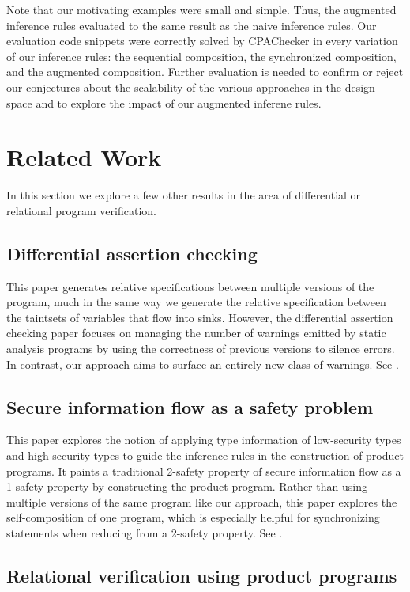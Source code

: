 \documentclass[letterpaper,twocolumn,10pt]{article}
\begin{document}
Note that our motivating examples were small and simple. Thus, the augmented inference rules evaluated to the same result as the naive inference rules. Our evaluation code snippets were correctly solved by CPAChecker in every variation of our inference rules: the sequential composition, the synchronized composition, and the augmented composition. Further evaluation is needed to confirm or reject our conjectures about the scalability of the various approaches in the design space and to explore the impact of our augmented inferene rules.

\section{Related Work}

In this section we explore a few other results in the area of differential or relational program verification.

\subsection{Differential assertion checking}

This paper generates relative specifications between multiple versions of the program, much in the same way we generate the relative specification between the taintsets of variables that flow into sinks. However, the differential assertion checking paper focuses on managing the number of warnings emitted by static analysis programs by using the correctness of previous versions to silence errors. In contrast, our approach aims to surface an entirely new class of warnings. See \cite{lahiri2013differential}.

\subsection{Secure information flow as a safety problem}
This paper explores the notion of applying type information of low-security types and high-security types to guide the inference rules in the construction of product programs. It paints a traditional 2-safety property of secure information flow as a 1-safety property by constructing the product program. Rather than using multiple versions of the same program like our approach, this paper explores the self-composition of one program, which is especially helpful for synchronizing statements when reducing from a 2-safety property. See  \cite{terauchi2005secure}.

\subsection{Relational verification using product programs}
\end{document}

